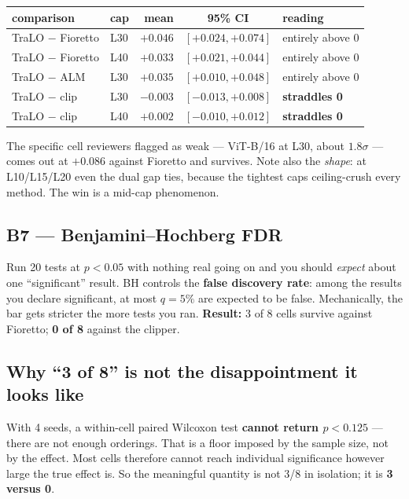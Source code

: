 \documentclass[11pt,a4paper]{article}
\begin{document}
\begin{center}\small
\begin{tabular}{llrcl}
\toprule
comparison & cap & mean & 95\% CI & reading \\
\midrule
TraLO $-$ Fioretto & L30 & $+0.046$ & $[+0.024, +0.074]$ & entirely above 0 \\
TraLO $-$ Fioretto & L40 & $+0.033$ & $[+0.021, +0.044]$ & entirely above 0 \\
TraLO $-$ ALM      & L30 & $+0.035$ & $[+0.010, +0.048]$ & entirely above 0 \\
TraLO $-$ clip     & L30 & $-0.003$ & $[-0.013, +0.008]$ & \textbf{straddles 0} \\
TraLO $-$ clip     & L40 & $+0.002$ & $[-0.010, +0.012]$ & \textbf{straddles 0} \\
\bottomrule
\end{tabular}
\end{center}

\noindent The specific cell reviewers flagged as weak --- ViT-B/16 at L30, about $1.8\sigma$
--- comes out at $+0.086$ against Fioretto and survives. Note also the \emph{shape}: at
L10/L15/L20 even the dual gap ties, because the tightest caps ceiling-crush every method.
The win is a mid-cap phenomenon.

\subsection{B7 --- Benjamini--Hochberg FDR}
Run 20 tests at $p<0.05$ with nothing real going on and you should \emph{expect} about one
``significant'' result. BH controls the \textbf{false discovery rate}: among the results you
declare significant, at most $q{=}5\%$ are expected to be false. Mechanically, the bar gets
stricter the more tests you ran. \textbf{Result:} 3 of 8 cells survive against Fioretto;
\textbf{0 of 8} against the clipper.

\subsection{Why ``3 of 8'' is not the disappointment it looks like}
With 4 seeds, a within-cell paired Wilcoxon test \textbf{cannot return $p<0.125$} --- there
are not enough orderings. That is a floor imposed by the sample size, not by the effect.
Most cells therefore cannot reach individual significance however large the true effect is.
So the meaningful quantity is not 3/8 in isolation; it is \textbf{3 versus 0}.
\end{document}
